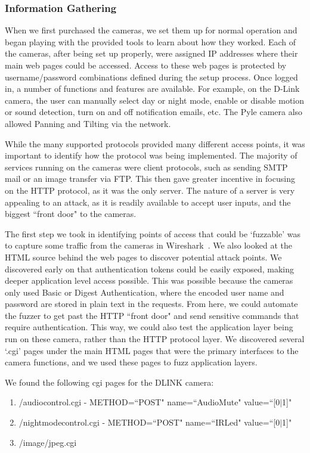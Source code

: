 \documentclass[letterpaper,twocolumn,10pt]{article}
\begin{document}
\subsubsection{Information Gathering}
When we first purchased the cameras, we set them up for normal operation and began playing with the provided tools to learn about how they worked. Each of the cameras, after being set up properly, were assigned IP addresses where their main web pages could be accessed. Access to these web pages is protected by username/password combinations defined during the setup process. Once logged in, a number of functions and features are available. For example, on the D-Link camera, the user can manually select day or night mode, enable or disable motion or sound detection, turn on and off notification emails, etc. The Pyle camera also allowed Panning and Tilting via the network.

While the many supported protocols provided many different access points, it was important to identify how the protocol was being implemented. The majority of services running on the cameras were client protocols, such as sending SMTP mail or an image transfer via FTP. This then gave greater incentive in focusing on the HTTP protocol, as it was the only server. The nature of a server is very appealing to an attack, as it is readily available to accept user inputs, and the biggest ``front door" to the cameras.

The first step we took in identifying points of access that could be `fuzzable' was to capture some traffic from the cameras in Wireshark~\cite{wireshark}. We also looked at the HTML source behind the web pages to discover potential attack points. We discovered early on that authentication tokens could be easily exposed, making deeper application level access possible. This was possible because the cameras only used Basic or Digest Authentication, where the encoded user name and password are stored in plain text in the requests. From here, we could automate the fuzzer to get past the HTTP ``front door" and send sensitive commands that require authentication. This way, we could also test the application layer being run on these camera, rather than the HTTP protocol layer. We discovered several `.cgi' pages under the main HTML pages that were the primary interfaces to the camera functions, and we used these pages to fuzz application layers.

We found the following cgi pages for the DLINK camera: 


\begin{enumerate}
	\item /audiocontrol.cgi - METHOD=``POST" name=``AudioMute" value=``[0$\mid$1]"
	\item /nightmodecontrol.cgi - METHOD=``POST" name=``IRLed" value=``[0$\mid$1]"
	\item /image/jpeg.cgi
\end{enumerate}
\end{document}
